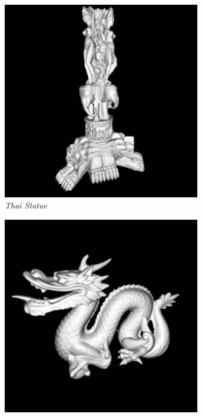 \documentclass[crop=false]{standalone}
\begin{document}
      \begin{figure}[h]
        \center
        \begin{subfigure}[b]{0.24\textwidth}
          \center
          \includegraphics[width=0.95\textwidth]{images/thai_statue.png}
          \caption{\textit{Thai Statue}}
        \end{subfigure}
        \begin{subfigure}[b]{0.24\textwidth}
          \center
          \includegraphics[width=0.95\textwidth]{images/dragon.png}

\end{subfigure}
\end{figure}
\end{document}
